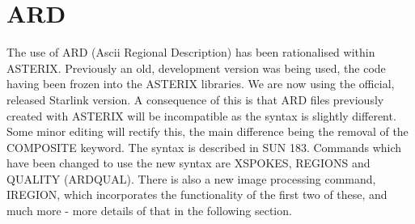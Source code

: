 \documentclass{book}
\renewcommand{\_}{{\tt\char'137}}     %
\begin{document}
\section{ARD}
The use of ARD (Ascii Regional Description) has been rationalised
within ASTERIX. Previously an old, development version was being
used, the code having been frozen into the ASTERIX libraries. We
are now using the official, released Starlink version. A
consequence of this is that ARD files previously created with
ASTERIX will be incompatible as the syntax is slightly different.
Some minor editing will rectify this, the main difference being
the removal of the COMPOSITE keyword. The syntax is described in
SUN 183. Commands which have been changed to use the new syntax
are XSPOKES, REGIONS and QUALITY (ARDQUAL). There is also a new
image processing command, IREGION, which incorporates the
functionality of the first two of these, and much more - more
details of that in the following section.
\end{document}
